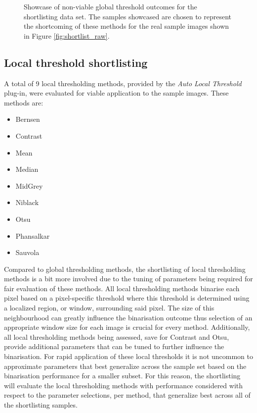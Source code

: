 \begin{figure}[ht!]
	\caption[Showcase of non-viable global threshold outcomes for the shortlisting data set.]{Showcase of non-viable global threshold outcomes for the shortlisting data set. The samples showcased are chosen to represent the shortcoming of these methods for the real sample images shown in Figure \ref{fig:shortlist_raw}.}
	\label{fig:bad_global_subset}
\end{figure}
\FloatBarrier
\subsection{Local threshold shortlisting}
A total of 9 local thresholding methods, provided by the \textit{Auto Local Threshold} plug-in, were evaluated for viable application to the sample images. These methods are:
\begin{multicols}{3}
	\begin{itemize}
		\setlength\itemsep{1mm}
		\item Bernsen
		\item Contrast
		\item Mean
		\item Median
		\item MidGrey
		\item Niblack
		\item Otsu
		\item Phansalkar
		\item Sauvola
	\end{itemize}
\end{multicols}
Compared to global thresholding methods, the shortlisting of local thresholding methods is a bit more involved due to the tuning of parameters being required for fair evaluation of these methods. All local thresholding methods binarise each pixel based on a pixel-specific threshold where this threshold is determined using a localized region, or window, surrounding said pixel. The size of this neighbourhood can greatly influence the binarisation outcome thus selection of an appropriate window size for each image is crucial for every method. Additionally, all local thresholding methods being assessed, save for Contrast and Otsu, provide additional parameters that can be tuned to further influence the binarisation. For rapid application of these local thresholds it is not uncommon to approximate parameters that best generalize across the sample set based on the binarisation performance for a smaller subset. For this reason, the shortlisting will evaluate the local thresholding methods with performance considered with respect to the parameter selections, per method, that generalize best across all of the shortlisting samples. 

